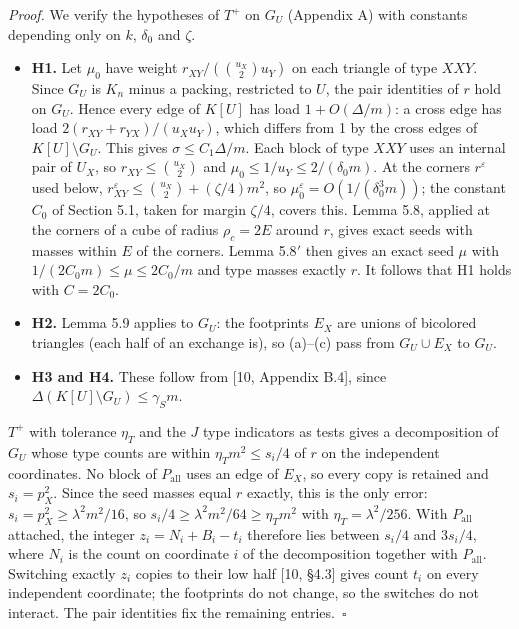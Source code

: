 \documentclass[english,11pt,a4paper]{article}
\providecommand{\tightlist}{\setlength{\itemsep}{0pt}\setlength{\parskip}{0pt}}
\begin{document}
\emph{Proof.} We verify the hypotheses of \(T^+\) on \(G_U\) (Appendix A) with constants depending only on \(k\), \(\delta_0\) and \(\zeta\).

\begin{itemize}
\tightlist
\item
  \textbf{H1.} Let \(\mu_0\) have weight \(r_{XY}/(\binom{u_X}{2}u_Y)\) on each triangle of type \(XXY\). Since \(G_U\) is \(K_n\) minus a packing, restricted to \(U\), the pair identities of \(r\) hold on \(G_U\). Hence every edge of \(K[U]\) has load \(1+O(\Delta/m)\): a cross edge has load \(2(r_{XY}+r_{YX})/(u_Xu_Y)\), which differs from 1 by the cross edges of \(K[U]\setminus G_U\). This gives \(\sigma\le C_1\Delta/m\). Each block of type \(XXY\) uses an internal pair of \(U_X\), so \(r_{XY}\le\binom{u_X}{2}\) and \(\mu_0\le1/u_Y\le2/(\delta_0m)\). At the corners \(r^\varepsilon\) used below, \(r^\varepsilon_{XY}\le\binom{u_X}{2}+(\zeta/4)m^2\), so \(\mu_0^\varepsilon=O(1/(\delta_0^3m))\); the constant \(C_0\) of Section 5.1, taken for margin \(\zeta/4\), covers this. Lemma 5.8, applied at the corners of a cube of radius \(\rho_c=2E\) around \(r\), gives exact seeds with masses within \(E\) of the corners. Lemma 5.8\('\) then gives an exact seed \(\mu\) with \(1/(2C_0m)\le\mu\le2C_0/m\) and type masses exactly \(r\). It follows that H1 holds with \(C=2C_0\).
\item
  \textbf{H2.} Lemma 5.9 applies to \(G_U\): the footprints \(E_X\) are unions of bicolored triangles (each half of an exchange is), so (a)--(c) pass from \(G_U\cup E_X\) to \(G_U\).
\item
  \textbf{H3 and H4.} These follow from {[}10, Appendix B.4{]}, since \(\Delta(K[U]\setminus G_U)\le\gamma_Sm\).
\end{itemize}

\(T^+\) with tolerance \(\eta_T\) and the \(J\) type indicators as tests gives a decomposition of \(G_U\) whose type counts are within \(\eta_Tm^2\le s_i/4\) of \(r\) on the independent coordinates. No block of \(P_{\mathrm{all}}\) uses an edge of \(E_X\), so every copy is retained and \(s_i=p_X^2\). Since the seed masses equal \(r\) exactly, this is the only error: \(s_i=p_X^2\ge\lambda^2m^2/16\), so \(s_i/4\ge\lambda^2m^2/64\ge\eta_Tm^2\) with \(\eta_T=\lambda^2/256\). With \(P_{\mathrm{all}}\) attached, the integer \(z_i=N_i+B_i-t_i\) therefore lies between \(s_i/4\) and \(3s_i/4\), where \(N_i\) is the count on coordinate \(i\) of the decomposition together with \(P_{\mathrm{all}}\). Switching exactly \(z_i\) copies to their low half {[}10, §4.3{]} gives count \(t_i\) on every independent coordinate; the footprints do not change, so the switches do not interact. The pair identities fix the remaining entries.~\(\square\)
\end{document}
